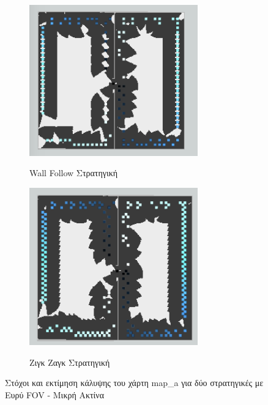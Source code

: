 \begin{figure}[H]
     \centering
     \captionsetup{justification=centering}
     \begin{subfigure}[b]{0.5\textwidth}
         \centering
         \includegraphics[width=0.8\textwidth]{./images/chapter6/map_a_wall_follow_wide_short.png}
         \label{fig:map_a_wall_follow_wide_short}
         \caption{Wall Follow Στρατηγική}
     \end{subfigure}%
     \begin{subfigure}[b]{0.5\textwidth}
         \centering
         \includegraphics[width=0.8\textwidth]{./images/chapter6/map_a_zig_zag_wide_short.png}
         \label{fig:map_a_zig_zag_wide_short}
         \caption{Ζιγκ Ζαγκ Στρατηγική}
     \end{subfigure}
     \caption{Στόχοι και εκτίμηση κάλυψης του χάρτη map\_a για δύο στρατηγικές με Ευρύ FOV - Μικρή Ακτίνα}
    \label{fig:map_a_pattern_nodes_compare}
\end{figure}


